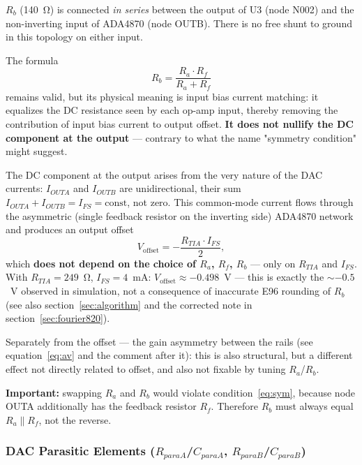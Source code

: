 \documentclass[a4paper, 12pt]{article}
\begin{document}
\textbf{\(R_{b}\)} (140~Ω) is connected \emph{in series} between the
output of U3 (node N002) and the non-inverting input of ADA4870 (node OUTB).
There is no free shunt to ground in this topology on either input.

The formula
\begin{equation}
  \boxed{R_b = \frac{R_a \cdot R_f}{R_a + R_f}}
  \label{eq:sym}
\end{equation}
remains valid, but its physical meaning is input bias current matching:
it equalizes the DC resistance seen by each op-amp input, thereby removing
the contribution of input bias current to output offset. \textbf{It does
not nullify the DC component at the output} — contrary to what the name
"symmetry condition" might suggest.

The DC component at the output arises from the very nature of the DAC currents:
\(I_{OUTA}\) and \(I_{OUTB}\) are unidirectional, their sum
\(I_{OUTA}+I_{OUTB}=I_{FS}=\text{const}\), not zero. This common-mode
current flows through the asymmetric (single feedback resistor on the
inverting side) ADA4870 network and produces an output offset
\begin{equation}
  V_{\text{offset}} = -\frac{R_{TIA}\cdot I_{FS}}{2},
  \label{eq:offset}
\end{equation}
which \textbf{does not depend on the choice of \(R_a\), \(R_f\), \(R_b\)} —
only on \(R_{TIA}\) and \(I_{FS}\). With \(R_{TIA}=249\)~Ω,
\(I_{FS}=4\)~mA: \(V_{\text{offset}} \approx -0.498\)~V — this is exactly
the \(\sim{-0.5}\)~V observed in simulation, not a consequence of
inaccurate E96 rounding of \(R_b\) (see also section~\ref{sec:algorithm}
and the corrected note in section~\ref{sec:fourier820}).

Separately from the offset — the gain asymmetry between the rails
(see equation~\eqref{eq:av} and the comment after it): this is also
structural, but a different effect not directly related to offset,
and also not fixable by tuning \(R_a\)/\(R_b\).

\textbf{Important:} swapping \(R_{a}\) and \(R_{b}\) would violate
condition~\eqref{eq:sym}, because node OUTA additionally has the feedback
resistor \(R_f\). Therefore \(R_b\) must always equal \(R_a \parallel R_f\),
not the reverse.

\subsubsection{DAC Parasitic Elements (\texorpdfstring{\(R_{paraA}\)/\(C_{paraA}\), \(R_{paraB}\)/\(C_{paraB}\)}{Rpara/Cpara})}
\end{document}
